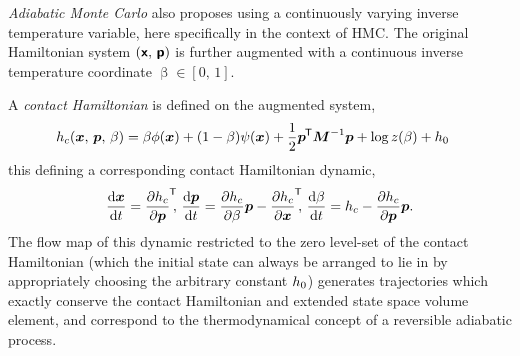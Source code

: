 
\emph{Adiabatic Monte Carlo} \citep{betancourt2014adiabatic} also proposes using a continuously varying inverse temperature variable, here specifically in the context of \ac{HMC}. The original Hamiltonian system $(\boldsymbol{\mathsf{x}},\,\boldsymbol{\mathsf{p}})$ is further augmented with a continuous inverse temperature coordinate $\upbeta \in [0,\,1]$. %

A \emph{contact Hamiltonian} is defined on the augmented system, 
\begin{equation}\label{eq:contact-hamiltonian}
\begin{split}
  h_c(\boldsymbol{x},\,\boldsymbol{p},\,\beta) = \beta \phi(\boldsymbol{x}) &+ ( 1 - \beta ) \psi(\boldsymbol{x}) 
  + \frac{1}{2}\boldsymbol{p}^{\mkern-1.5mu\mathsf{T}}\boldsymbol{M}^{-1}\boldsymbol{p} 
  + \log z(\beta) + h_0
\end{split}
\end{equation}
this defining a corresponding contact Hamiltonian dynamic, 
\begin{equation}\label{eq:contact-hamiltonian-flow}
  \frac{\mathrm{d} \boldsymbol{x}}{\mathrm{d} t} = \frac{\partial h_c}{\partial \boldsymbol{p}}^{\mkern-1.5mu\mathsf{T}}\kern-3pt,\,
  \frac{\mathrm{d} \boldsymbol{p}}{\mathrm{d} t} = \frac{\partial h_c}{\partial \beta} \boldsymbol{p} -\frac{\partial h_c}{\partial \boldsymbol{x}}^{\mkern-1.5mu\mathsf{T}}\kern-3pt,\,
  \frac{\mathrm{d} \beta}{\mathrm{d} t} = h_c - \frac{\partial h_c}{\partial \boldsymbol{p}}\boldsymbol{p}.
\end{equation}
The flow map of this dynamic restricted to the zero level-set of the contact Hamiltonian (which the initial state can always be arranged to lie in by appropriately choosing the arbitrary constant $h_0$) generates trajectories which exactly conserve the contact Hamiltonian and extended state space volume element, and correspond to the thermodynamical concept of a reversible adiabatic process. 


